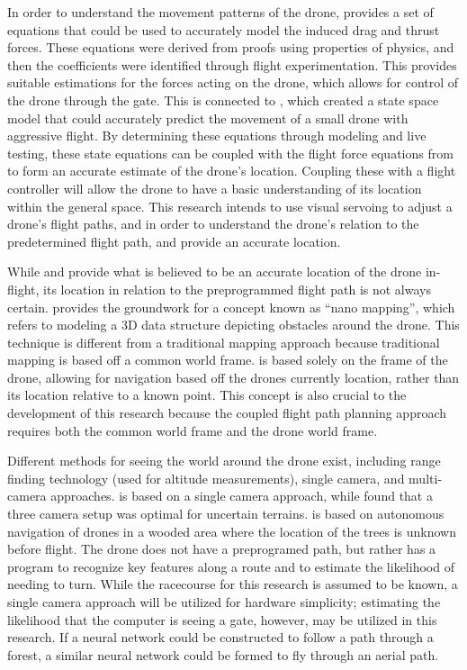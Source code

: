 \documentclass[onecolumn,10pt]{IEEEtran}
\begin{document}
In order to understand the movement patterns of the drone, \cite{svacha2017improving} provides a set of equations that could be used to accurately model the induced drag and thrust forces. These equations were derived from proofs using properties of physics, and then the coefficients were identified through flight experimentation. This provides suitable estimations for the forces acting on the drone, which allows for control of the drone through the gate. This is connected to \cite{condliffe2016is}, which created a state space model that could accurately predict the movement of a small drone with aggressive flight. By determining these equations through modeling and live testing, these state equations can be coupled with the flight force equations from \cite{svacha2017improving} to form an accurate estimate of the drone’s location. Coupling these with a flight controller will allow the drone to have a basic understanding of its location within the general space. This research intends to use visual servoing to adjust a drone’s flight paths, and in order to understand the drone’s relation to the predetermined flight path, \cite{svacha2017improving} and \cite{loianno2017estimation} provide an accurate location.
    
While \cite{svacha2017improving} and \cite{loianno2017estimation} provide what is believed to be an accurate location of the drone in-flight, its location in relation to the preprogrammed flight path is not always certain. \cite{florence2018nanomap} provides the groundwork for a concept known as ``nano mapping'', which refers to modeling a 3D data structure depicting obstacles around the drone. This technique is different from a traditional mapping approach because traditional mapping is based off a common world frame. \cite{florence2018nanomap} is based solely on the frame of the drone, allowing for navigation based off the drones currently location, rather than its location relative to a known point. This concept is also crucial to the development of this research because the coupled flight path planning approach requires both the common world frame and the drone world frame.

Different methods for seeing the world around the drone exist, including range finding technology (used for altitude measurements), single camera, and multi-camera approaches. \cite{loianno2017estimation} is based on a single camera approach, while \cite{iot2018how} found that a three camera setup was optimal for uncertain terrains. \cite{zhilenkov2018use} is based on autonomous navigation of drones in a wooded area where the location of the trees is unknown before flight. The drone does not have a preprogramed path, but rather has a program to recognize key features along a route and to estimate the likelihood of needing to turn. While the racecourse for this research is assumed to be known, a single camera approach will be utilized for hardware simplicity; estimating the likelihood that the computer is seeing a gate, however, may be utilized in this research. If a neural network could be constructed to follow a path through a forest, a similar neural network could be formed to fly through an aerial path.
    
\end{document}
